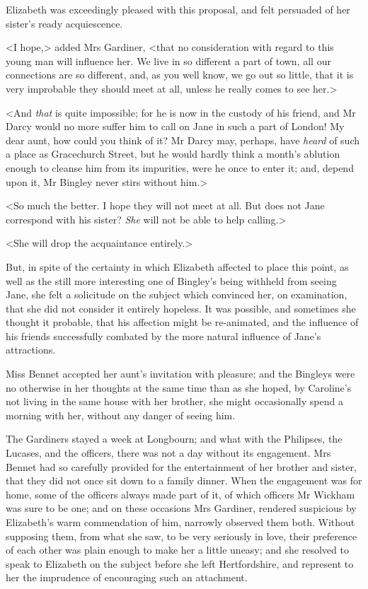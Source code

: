 Elizabeth was exceedingly pleased with this proposal, and felt persuaded of her sister's ready acquiescence.

<I hope,> added Mrs Gardiner, <that no consideration with regard to this young man will influence her. We live in so different a part of town, all our connections are so different, and, as you well know, we go out so little, that it is very improbable they should meet at all, unless he really comes to see her.>

<And \textit{that} is quite impossible; for he is now in the custody of his friend, and Mr Darcy would no more suffer him to call on Jane in such a part of London! My dear aunt, how could you think of it? Mr Darcy may, perhaps, have \textit{heard} of such a place as Gracechurch Street, but he would hardly think a month's ablution enough to cleanse him from its impurities, were he once to enter it; and, depend upon it, Mr Bingley never stirs without him.>

<So much the better. I hope they will not meet at all. But does not Jane correspond with his sister? \textit{She} will not be able to help calling.>

<She will drop the acquaintance entirely.>

But, in spite of the certainty in which Elizabeth affected to place this point, as well as the still more interesting one of Bingley's being withheld from seeing Jane, she felt a solicitude on the subject which convinced her, on examination, that she did not consider it entirely hopeless. It was possible, and sometimes she thought it probable, that his affection might be re-animated, and the influence of his friends successfully combated by the more natural influence of Jane's attractions.

Miss Bennet accepted her aunt's invitation with pleasure; and the Bingleys were no otherwise in her thoughts at the same time than as she hoped, by Caroline's not living in the same house with her brother, she might occasionally spend a morning with her, without any danger of seeing him.

The Gardiners stayed a week at Longbourn; and what with the Philipses, the Lucases, and the officers, there was not a day without its engagement. Mrs Bennet had so carefully provided for the entertainment of her brother and sister, that they did not once sit down to a family dinner. When the engagement was for home, some of the officers always made part of it, of which officers Mr Wickham was sure to be one; and on these occasions Mrs Gardiner, rendered suspicious by Elizabeth's warm commendation of him, narrowly observed them both. Without supposing them, from what she saw, to be very seriously in love, their preference of each other was plain enough to make her a little uneasy; and she resolved to speak to Elizabeth on the subject before she left Hertfordshire, and represent to her the imprudence of encouraging such an attachment.

